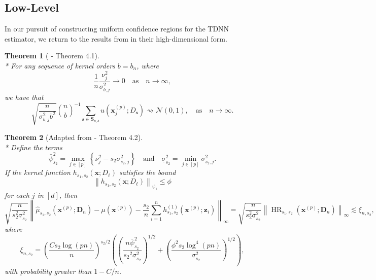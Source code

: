 \documentclass[letterpaper,10pt]{article}
\numberwithin{equation}{section}
\newtheorem{thm}{Theorem}
\numberwithin{thm}{section}
\numberwithin{lem}{section}
\numberwithin{cor}{section}
\renewcommand{\hat}{\widehat}
\newcommand{\1}{\mathbbm{1}}
\begin{document}
\subsection{Low-Level}
In our pursuit of constructing uniform confidence regions for the TDNN estimator, we return to the results from \citet{ritzwoller_uniform_2024} in their high-dimensional form.

\begin{thm}[\citet{ritzwoller_uniform_2024} - Theorem 4.1]\label{thm:rit4_1}\mbox{}\\*
	For any sequence of kernel orders $b=b_n$, where
	\begin{equation}
		\frac{1}{n} \frac{\nu_j^2}{\sigma_{b, j}^2} \rightarrow 0
		\quad \text{as} \quad
		n \rightarrow \infty,
	\end{equation}
	we have that
	\begin{equation}
		\sqrt{\frac{n}{\sigma_{b, j}^2 b^2}} \binom{n}{b}^{-1} \sum_{\mathbf{s} \in \mathbf{S}_{n, b}} u\left(\mathbf{x}^{(p)}_{j} ; D_{\mathbf{s}}\right) \rightsquigarrow \mathcal{N}(0,1),
		\quad \text{as} \quad
		n \rightarrow \infty.
	\end{equation}
\end{thm}


\begin{thm}[Adapted from \citet{ritzwoller_uniform_2024} - Theorem 4.2]\label{thm:rit4_2}\mbox{}\\*
	Define the terms
	\begin{equation}
		\bar{\psi}_{s_2}^2
		= \max_{j \in[p]}\left\{\nu_j^2- s_2 \sigma_{s_2, j}^2\right\}
		\quad \text {and} \quad
		\underline{\sigma}_{s_2}^2
		= \min_{j \in[p]} \sigma_{s_2, j}^2.
	\end{equation}
	If the kernel function $h_{s_1, s_2}\left(\mathbf{x} ; D_{\ell}\right)$ satisfies the bound
	\begin{equation}
		\left\|h_{s_1, s_2}\left(\mathbf{x} ; D_{\ell}\right)\right\|_{\psi_1} \leq \phi
	\end{equation}
	for each $j$ in $[d]$, then
	\begin{equation}
		\sqrt{\frac{n}{s_2^2 \underline{\sigma}_{s_2}^2}}
		\left\|\hat{\mu}_{s_1, s_2}(\mathbf{x}^{(p)}; \mathbf{D}_n) - \mu(\mathbf{x}^{(p)}) - \frac{s_2}{n} \sum_{i=1}^n h^{(1)}_{s_1, s_2}(\mathbf{x}^{(p)}; \mathbf{z}_{i})\right\|_{\infty}
		= \sqrt{\frac{n}{s_2^2 \underline{\sigma}_{s_2}^2}} \left\|\operatorname{HR}_{s_1, s_2}(\mathbf{x}^{(p)}; \mathbf{D}_n)\right\|_{\infty}
		\lesssim \xi_{n, s_2},
	\end{equation}
	where
	\begin{equation}
		\xi_{n, s_2}
		= \left(\frac{C s_2 \log(p n)}{n}\right)^{s_2 / 2}\left(\left(\frac{n \bar{\psi}_{s_2}^2}{{s_2}^2 \underline{\sigma}_{s_2}^2}\right)^{1 / 2}+\left(\frac{\phi^2 s_2 \log ^4(p n)}{\underline{\sigma}_{s_2}^2}\right)^{1 / 2}\right),
	\end{equation}
	with probability greater than $1-C / n$.
\end{thm}
\end{document}
